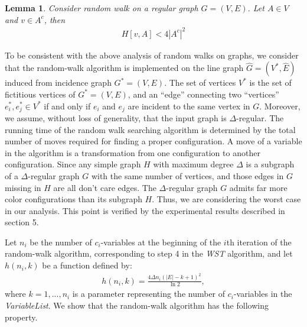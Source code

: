 \documentclass[11pt]{article}
\newtheorem{lemma}[theorem]{Lemma}
\begin{document}
\begin{lemma} 
\label{lemma:hittime}
Consider random walk on a regular graph $G=(V,E)$. Let $A\in V$ and $v\in A^c$, then       
\begin{align}
 H[v,A]<4|A^c |^2 \nonumber 
\end{align}
\end{lemma}

To be consistent with the above analysis of random walks on graphs, we consider that the random-walk algorithm is implemented on the line graph $ \widehat{G} = (V^*,\widehat{E})$ induced from incidence graph $G^*=(V,E)$. The set of vertices $V^*$  is the set of fictitious vertices of $G^*=(V,E)$, and an ``edge'' connecting two ``vertices'' $e_i^*, e_j^*\in V^*$ if and only if $e_i$ and $e_j$  are incident to the same vertex in $G$. Moreover, we assume, without loss of generality, that the input graph is $\Delta$-regular. The running time of the random walk searching algorithm is determined by the total number of moves required for finding a proper configuration. A move of a variable in the algorithm is a transformation from one configuration to another configuration. Since any simple graph $H$ with maximum degree $\Delta$ is a subgraph of a $\Delta$-regular graph $G$ with the same number of vertices, and those edges in $G$ missing in $H$ are all don't care edges. The $\Delta$-regular graph $G$ admits far more color configurations than its subgraph $H$. Thus, we are considering the worst case in our analysis. This point is verified by the experimental results described in section 5. 

Let $n_i$ be the number of $c_i$-variables at the beginning of the $i$th iteration of the random-walk algorithm, corresponding to step 4 in the {\it WST} algorithm, and let $h(n_i,k)$ be a function defined by:
\begin{align}
\label{eq:h}
  h(n_i,k)= \frac{4 \Delta n_i(|E|-k+1)^2}{\ln{2} },
\end{align}
where $k=1,...,n_i$  is a parameter representing the number of $c_i$-variables in the {\it VariableList}. We show that the random-walk algorithm has the following property.
\end{document}
